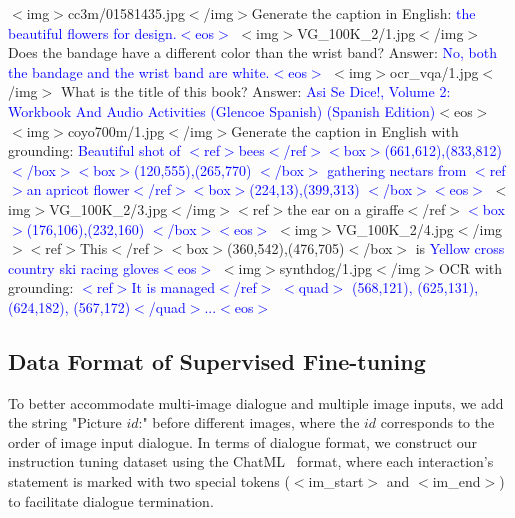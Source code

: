 \documentclass{article}
\begin{document}
\begin{tcolorbox}[colback=black!5!white,colframe=black!75!black,title=Image Captioning]
$<$img$>$cc3m/01581435.jpg$<$/img$>$Generate the caption in English: \textcolor{blue}{the beautiful flowers for design.$<$eos$>$}
$<$img$>$VG\_100K\_2/1.jpg$<$/img$>$ Does the bandage have a different color than the wrist band? Answer: \textcolor{blue}{No, both the bandage and the wrist band are white.$<$eos$>$}
$<$img$>$ocr\_vqa/1.jpg$<$/img$>$ What is the title of this book? Answer: \textcolor{blue}{Asi Se Dice!, Volume 2: Workbook And Audio Activities (Glencoe Spanish) (Spanish Edition)}$<$eos$>$
$<$img$>$coyo700m/1.jpg$<$/img$>$Generate the caption in English with grounding: \textcolor{blue}{Beautiful shot of $<$ref$>$bees$<$/ref$>$$<$box$>$(661,612),(833,812)$<$/box$>$$<$box$>$(120,555),(265,770) $<$/box$>$ gathering nectars from $<$ref$>$an apricot flower$<$/ref$>$$<$box$>$(224,13),(399,313) $<$/box$>$$<$eos$>$}
$<$img$>$VG\_100K\_2/3.jpg$<$/img$>$$<$ref$>$the ear on a giraffe$<$/ref$>$\textcolor{blue}{$<$box$>$(176,106),(232,160) $<$/box$>$$<$eos$>$}
$<$img$>$VG\_100K\_2/4.jpg$<$/img$>$$<$ref$>$This$<$/ref$>$$<$box$>$(360,542),(476,705)$<$/box$>$ is \textcolor{blue}{Yellow cross country ski racing gloves$<$eos$>$}
$<$img$>$synthdog/1.jpg$<$/img$>$OCR with grounding: \textcolor{blue}{$<$ref$>$It is managed$<$/ref$>$ $<$quad$>$ (568,121), (625,131), (624,182), (567,172)$<$/quad$>$...$<$eos$>$}
\label{mt_format}
\end{tcolorbox}

\subsection{Data Format of Supervised Fine-tuning}
\label{app:data_format_stage3}

To better accommodate multi-image dialogue and multiple image inputs, we add the string "Picture $id$:" before different images, where the $id$ corresponds to the order of image input dialogue. In terms of dialogue format, we construct our instruction tuning dataset using the ChatML~\citep{chatml} format, where each interaction's statement is marked with two special tokens ($<$im\_start$>$ and $<$im\_end$>$) to facilitate dialogue termination.
\end{document}
